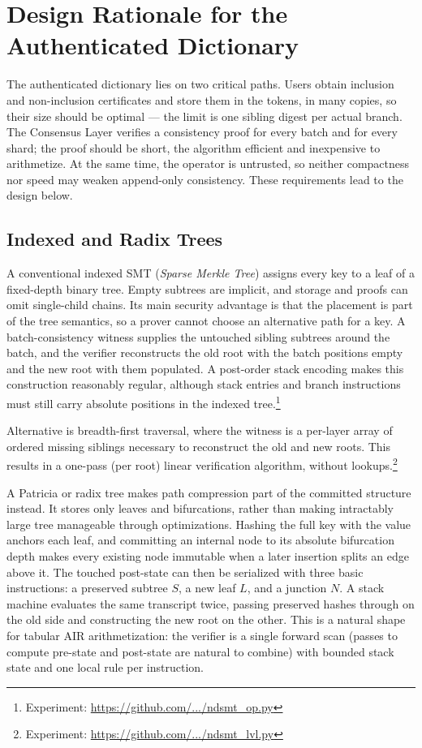 \documentclass[twocolumn]{article}
\begin{document}
\section{Design Rationale for the Authenticated Dictionary}
\label{sec:tree-design}

The authenticated dictionary lies on two critical paths. Users obtain inclusion and non-inclusion certificates and store them in the tokens, in many copies, so their size should be optimal --- the limit is one sibling digest per actual branch. The Consensus Layer verifies a consistency proof for every batch and for every shard; the proof should be short, the algorithm efficient and inexpensive to arithmetize. At the same time, the operator is untrusted, so neither compactness nor speed may weaken append-only consistency. These requirements lead to the design below.

\subsection{Indexed and Radix Trees}

A conventional indexed SMT (\emph{Sparse Merkle Tree}) assigns every key to a leaf of a fixed-depth binary tree. Empty subtrees are implicit, and storage and proofs can omit single-child chains. Its main security advantage is that the placement is part of the tree semantics, so a prover cannot choose an alternative path for a key. A batch-consistency witness supplies the untouched sibling subtrees around the batch, and the verifier reconstructs the old root with the batch positions empty and the new root with them populated. A post-order stack encoding makes this construction reasonably regular, although stack entries and branch instructions must still carry absolute positions in the indexed tree.\footnote{Experiment: \href{https://github.com/ristik/ndsmt-experiments/blob/main/ndsmt_op.py}{https://github.com/.../ndsmt\_op.py}}

Alternative is breadth-first traversal, where the witness is a per-layer array of ordered missing siblings necessary to reconstruct the old and new roots. This results in a one-pass (per root) linear verification algorithm, without lookups.\footnote{Experiment: \href{https://github.com/ristik/ndsmt-experiments/blob/main/ndsmt_lvl.py}{https://github.com/.../ndsmt\_lvl.py}}

A Patricia or radix tree makes path compression part of the committed structure instead. It stores only leaves and  bifurcations, rather than making intractably large tree manageable through optimizations. Hashing the full key with the value anchors each leaf, and committing an internal node to its absolute bifurcation depth makes every existing node immutable when a later insertion splits an edge above it. The touched post-state can then be serialized with three basic instructions: a preserved subtree \(S\), a new leaf \(L\), and a junction \(N\). A stack machine evaluates the same transcript twice, passing preserved hashes through on the old side and constructing the new root on the other. This is a natural shape for tabular AIR arithmetization: the verifier is a single forward scan (passes to compute pre-state and post-state are natural to combine) with bounded stack state and one local rule per instruction.
\end{document}
